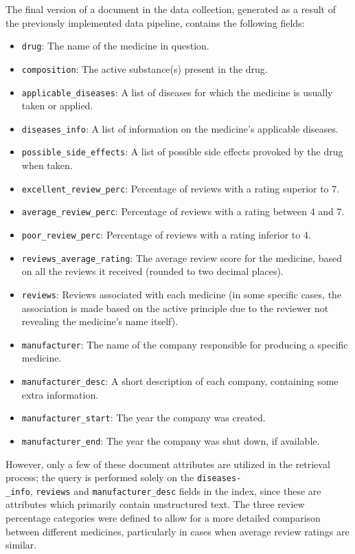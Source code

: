 \documentclass[sigconf]{acmart}
\begin{document}
The final version of a document in the data collection, generated as a result of the previously implemented data pipeline, contains the following fields:
\begin{itemize}
	\item {\texttt{drug}}: The name of the medicine in question.
	\item {\texttt{composition}}: The active substance(s) present in the drug.
	\item {\texttt{applicable\_diseases}}: A list of diseases for which the medicine is usually taken or applied.
	\item {\texttt{diseases\_info}}: A list of information on the medicine's applicable diseases.
	\item {\texttt{possible\_side\_effects}}: A list of possible side effects provoked by the drug when taken.
	\item {\texttt{excellent\_review\_perc}}: Percentage of reviews with a rating superior to 7.
	\item {\texttt{average\_review\_perc}}: Percentage of reviews with a rating between 4 and 7.
        \item {\texttt{poor\_review\_perc}}: Percentage of reviews 
    with a rating inferior to 4.
        \item {\texttt{reviews\_average\_rating}}: The average review score for 
    the medicine, based on all the reviews it received (rounded to two decimal places).
        \item {\texttt{reviews}}: Reviews associated with each medicine (in 
    some specific cases, the association is made based on the active principle due to the reviewer not revealing the medicine's name itself).
        \item {\texttt{manufacturer}}: The name of the company responsible 
    for producing a specific medicine.
        \item {\texttt{manufacturer\_desc}}: A short description of 
    each company, containing some extra information.
        \item {\texttt{manufacturer\_start}}: The year the company was created.
        \item {\texttt{manufacturer\_end}}: The year the company was shut 
    down, if available.
\end{itemize}

However, only a few of these document attributes are utilized in the retrieval process; the query is performed solely on the \texttt{diseases-\\\_info}, \texttt{reviews} and \texttt{manufacturer\_desc} fields in the index, since these are attributes which primarily contain unstructured text.
The three review percentage categories were defined to allow for a more detailed comparison between different medicines, particularly in cases when average review ratings are similar.
\end{document}
